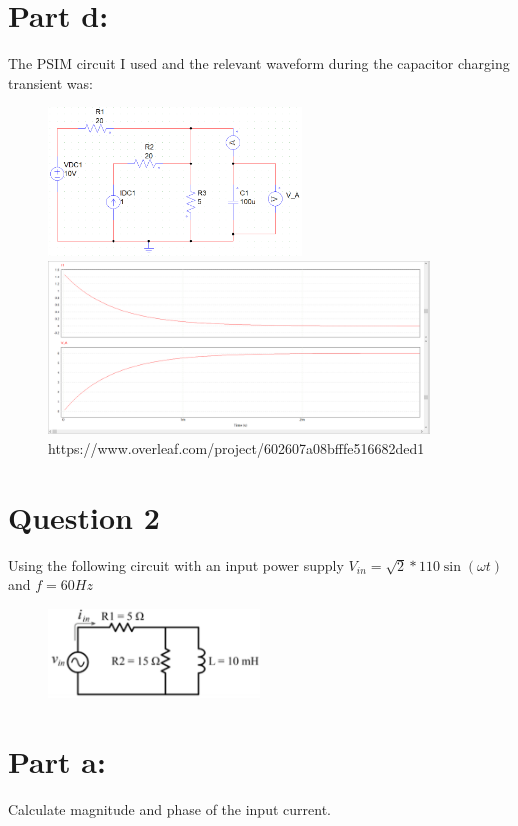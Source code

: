 \documentclass{article}
\begin{document}
\section*{Part d:}
The PSIM circuit I used and the relevant waveform during the capacitor charging transient was:
\begin{figure}[h]
    \centering
    \includegraphics[width=0.6\textwidth]{Psim-Q1-circuit}
    \includegraphics[width=0.9\textwidth]{psim-q1-Graph}
    \label{PSIM circuit q1}https://www.overleaf.com/project/602607a08bfffe516682ded1
\end{figure}


\section{Question 2}
Using the following circuit with an input power supply $V_{in}=\sqrt{2}*110 \sin{(\omega t)}$ and $f=60Hz$
\begin{figure}[h]
    \centering
    \includegraphics[width=0.5\textwidth]{q2-circuit}
    \label{q2 circuit}
\end{figure}
\section*{Part a:}
Calculate magnitude and phase of the input current.
\end{document}

